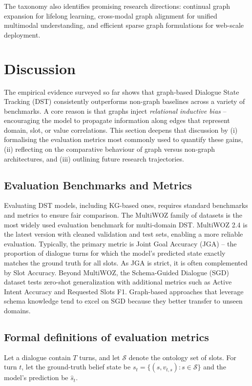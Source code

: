 \documentclass[11pt]{article}
\begin{document}
The taxonomy also identifies promising research directions: continual graph expansion for lifelong learning, cross-modal graph alignment for unified multimodal understanding, and efficient sparse graph formulations for web-scale deployment.
\section{Discussion}
The empirical evidence surveyed so far shows that graph‐based Dialogue State Tracking (DST) consistently outperforms non-graph baselines across a variety of benchmarks.  A core reason is that graphs inject \emph{relational inductive bias} – encouraging the model to propagate information along edges that represent domain, slot, or value correlations.  This section deepens that discussion by (i) formalising the evaluation metrics most commonly used to quantify these gains, (ii) reflecting on the comparative behaviour of graph versus non-graph architectures, and (iii) outlining future research trajectories.


\subsection{Evaluation Benchmarks and Metrics}
Evaluating DST models, including KG-based ones, requires standard benchmarks and metrics to ensure fair comparison. The MultiWOZ family of datasets \citep{Budzianowski2018MultiWOZ} is the most widely used evaluation benchmark for multi-domain DST. MultiWOZ 2.4 \citep{Ye2022MultiWOZ24} is the latest version with cleaned validation and test sets, enabling a more reliable evaluation. Typically, the primary metric is Joint Goal Accuracy (JGA) – the proportion of dialogue turns for which the model’s predicted state exactly matches the ground truth for all slots. As JGA is strict, it is often complemented by Slot Accuracy. Beyond MultiWOZ, the Schema-Guided Dialogue (SGD) dataset \citep{Rastogi2020SGD} tests zero-shot generalization with additional metrics such as Active Intent Accuracy and Requested Slots F1. Graph-based approaches that leverage schema knowledge tend to excel on SGD because they better transfer to unseen domains. 
\subsection{Formal definitions of evaluation metrics}
Let a dialogue contain \(T\) turns, and let \(\mathcal{S}\) denote the ontology set of slots.  For turn \(t\), let the ground-truth belief state be \(s_t=\{(s,v_{t,s}) : s\in\mathcal{S}\}\) and the model’s prediction be \(\hat{s}_t\).
\end{document}

